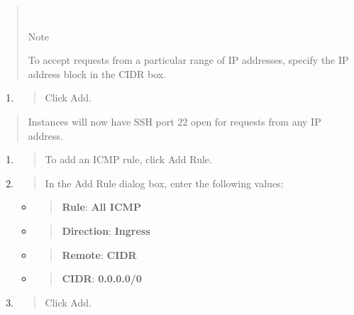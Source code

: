 \begin{quote}
~

Note

To accept requests from a particular range of IP addresses, specify the
IP address block in the CIDR box.
\end{quote}

\begin{enumerate}
\def\labelenumi{\arabic{enumi}.}
\item
  \begin{quote}
  Click Add.
  \end{quote}
\end{enumerate}

\begin{quote}
Instances will now have SSH port 22 open for requests from any IP address.
\end{quote}

\begin{enumerate}
\def\labelenumi{\arabic{enumi}.}
\item
  \begin{quote}
  To add an ICMP rule, click Add Rule.
  \end{quote}
\item
  \begin{quote}
  In the Add Rule dialog box, enter the following values:
  \end{quote}

  \begin{itemize}
  \item
    \begin{quote}
    \textbf{Rule}: \textbf{All ICMP}
    \end{quote}
  \item
    \begin{quote}
    \textbf{Direction}: \textbf{Ingress}
    \end{quote}
  \item
    \begin{quote}
    \textbf{Remote}: \textbf{CIDR}
    \end{quote}
  \item
    \begin{quote}
    \textbf{CIDR}: \textbf{0.0.0.0/0}
    \end{quote}
  \end{itemize}
\item
  \begin{quote}
  Click Add.
  \end{quote}
\end{enumerate}

